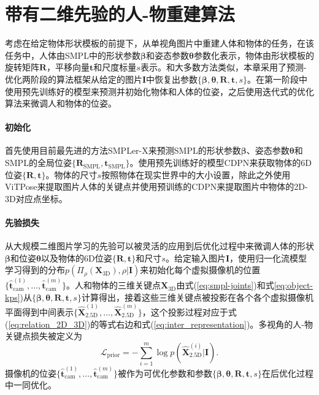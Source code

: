\clearpage

\section{带有二维先验的人-物重建算法}
考虑在给定物体形状模板的前提下，从单视角图片中重建人体和物体的任务，在该任务中，人体由SMPL中的形状参数$\mathbf{\beta}$和姿态参数$\mathbf{\theta}$参数化表示，物体由形状模板的旋转矩阵$\mathbf{R}$，平移向量$\mathbf{t}$和尺度标量$s$表示。和大多数方法类似，本章采用了预测-优化两阶段的算法框架从给定的图片$\mathbf{I}$中恢复出参数$\{\mathbf{\beta}, \mathbf{\theta}, \mathbf{R}, \mathbf{t}, s\}$。在第一阶段中使用预先训练好的模型来预测并初始化物体和人体的位姿，之后使用迭代式的优化算法来微调人和物体的位姿。

\paragraph{初始化}
首先使用目前最先进的方法SMPLer-X\citep{NEURIPS2023_2614947a}来预测SMPL的形状参数$\mathbf{\beta}$、姿态参数$\mathbf{\theta}$和SMPL的全局位姿$\{\mathbf{R}_{\text{SMPL}}, \mathbf{t}_{\text{SMPL}}\}$。使用预先训练好的模型CDPN\citep{Li_2019_ICCV}来获取物体的6D位姿$\{\mathbf{R}, \mathbf{t}\}$。物体的尺寸$s$按照物体在现实世界中的大小设置，除此之外使用ViTPose\citep{NEURIPS2022_fbb10d31}来提取图片人体的关键点并使用预训练的CDPN\citep{Li_2019_ICCV}来提取图片中物体的2D-3D对应点坐标。

\paragraph{先验损失}
从大规模二维图片学习的先验可以被灵活的应用到后优化过程中来微调人体的形状$\mathbf{\beta}$和位姿$\mathbf{\theta}$以及物体的6D位姿$\{\mathbf{R}, \mathbf{t}\}$和尺寸$s$。给定输入图片$\mathbf{I}$，使用归一化流模型学习得到的分布$p(\Pi_\rho(\mathbf{X}_{\text{3D}}), \rho | \mathbf{I})$来初始化每个虚拟摄像机的位置$\{\hat{\mathbf{t}}_{\text{cam}}^{(1)}, \dots, \hat{\mathbf{t}}_{\text{cam}}^{(m)}\}$。人和物体的三维关键点$\mathbf{X}_{\text{3D}}$由式(\ref{eq:smpl-joints})和式\ref{eq:object-kps})从$\{\mathbf{\beta}, \mathbf{\theta}, \mathbf{R}, \mathbf{t}, s\}$计算得出，接着这些三维关键点被投影在各个各个虚拟摄像机平面得到中间表示$\{ \hat{\mathbf{X}}_{\text{2.5D}}^{(1)}, \dots,  \hat{\mathbf{X}}_{\text{2.5D}}^{(m)}\}$，这个投影过程对应于式(\ref{eq:relation_2D_3D})的等式右边和式(\ref{eq:inter_representation})。多视角的人-物关键点损失被定义为
\begin{equation}
	\mathcal{L}_{\text{prior}} = - \sum_{i=1}^m \log p(\hat{\mathbf{X}}_{\text{2.5D}}^{(i)}|\mathbf{I}).
\end{equation}
摄像机的位姿$\{\hat{\mathbf{t}}_{\text{cam}}^{(1)}, \dots, \hat{\mathbf{t}}_{\text{cam}}^{(m)}\}$被作为可优化参数和参数$\{\mathbf{\beta}, \mathbf{\theta}, \mathbf{R}, \mathbf{t}, s\}$在后优化过程中一同优化。

